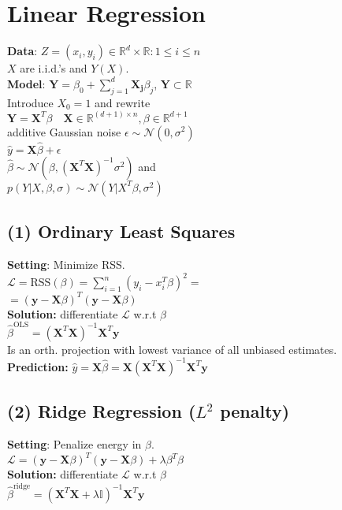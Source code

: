 \section*{Linear Regression}
\textbf{Data}:
$Z={(x_i,y_i)\in \mathbb{R}^d \times \mathbb{R}: 1 \leq i \leq n}$\\
$X$ are i.i.d.'s and $Y(X)$.\\
\textbf{Model}:
$\mathbf{Y}=\beta_0 + \sum_{j=1}^d\mathbf{X_j}\beta_j$, $ \mathbf{Y}\subset{\mathbb{R}}$\\
Introduce $X_0=1$ and rewrite\\
$\mathbf{Y}=\mathbf{X}^T\beta \quad \mathbf{X}\in\mathbb{R}^{(d+1)\times n}, \beta \in \mathbb{R}^{d+1}$\\
additive Gaussian noise $\epsilon \sim \mathcal{N}(0,\sigma^2)$\\
$\hat{y}=\mathbf{X}\hat{\beta}+\epsilon$\\
$\hat{\beta} \sim \mathcal{N}(\beta, (\mathbf{X}^T\mathbf{X})^{-1}\sigma^2) $ and\\
$p(Y|X,\beta, \sigma) \sim \mathcal{N}(Y|X^T\beta, \sigma^2)$



\subsection*{(1) Ordinary Least Squares}
\textbf{Setting}: Minimize RSS.\\
$\mathcal{L} = \text{RSS}(\beta)=\sum_{i=1}^n(y_i-x_i^T\beta)^2=$\\
$=(\mathbf{y}-\mathbf{X}\beta)^T(\mathbf{y}-\mathbf{X}\beta)$\\
\textbf{Solution:} differentiate $\mathcal{L}$ w.r.t $\beta$\\
$\hat{\beta}^\text{OLS} = (\mathbf{X}^T\mathbf{X})^{-1}\mathbf{X}^{T}\mathbf{y}$\\
Is an orth. projection with lowest variance of all unbiased estimates.\\
\textbf{Prediction:} $\hat{y}{=}\mathbf{X}\hat{\beta}{=}\mathbf{X}(\mathbf{X}^T\mathbf{X})^{-1}\mathbf{X}^{T}\mathbf{y}$


\subsection*{(2) Ridge Regression ($L^2$ penalty)}
\textbf{Setting}: Penalize energy in $\beta$.\\
$\mathcal{L} = (\mathbf{y}-\mathbf{X}\beta)^T(\mathbf{y}-\mathbf{X}\beta)+\lambda\beta^T\beta$\\
\textbf{Solution:} differentiate $\mathcal{L}$ w.r.t $\beta$\\
$\hat{\beta}^\text{ridge} = (\mathbf{X}^T\mathbf{X}+\lambda\mathbb{I})^{-1}\mathbf{X}^{T}\mathbf{y}$

